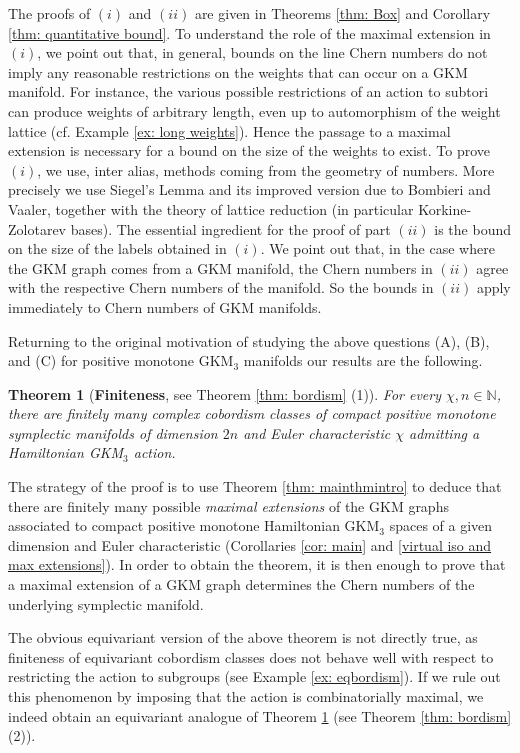\documentclass[12pt,a4paper]{amsart}
\newcommand{\NN}{\mathbb{N}}
\theoremstyle{plain}
\newtheorem{maintheorem}{Theorem}
\theoremstyle{definition}
\begin{document}
The proofs of $(i)$ and $(ii)$ are given in Theorems \ref{thm: Box} and Corollary \ref{thm: quantitative bound}.
To understand the role of the maximal extension in $(i)$, we point out that, in general, bounds on the line Chern numbers do not imply any reasonable restrictions on the weights that can occur on a GKM manifold. For instance, the various possible restrictions of an action to subtori can produce weights of arbitrary length, even up to automorphism of the weight lattice (cf. Example \ref{ex: long weights}). 
Hence the passage to a maximal extension is necessary for a bound on the size of the weights to exist. To prove $(i)$, we use, inter alias, methods coming from the geometry of numbers. More precisely we use Siegel's Lemma and its improved version due to Bombieri and Vaaler,
together with the theory of lattice reduction
(in particular Korkine-Zolotarev bases). The essential ingredient for the proof of part $(ii)$ is the bound on the size of the labels obtained in $(i)$. We point out that, in the case where the GKM graph comes from a GKM manifold, the Chern numbers in $(ii)$ agree with the respective Chern numbers of the manifold. So the bounds in $(ii)$ apply immediately to Chern numbers of GKM manifolds.



Returning to the original motivation of studying the above questions (A), (B), and (C) for positive monotone GKM$_3$ manifolds our results are the following.
\begin{maintheorem}[\textbf{Finiteness}, see Theorem \ref{thm: bordism} (1)]\label{thm: finiteness intro}
For every $\chi,n\in \NN$, there are finitely many complex cobordism classes of compact positive monotone symplectic manifolds of dimension $2n$ and Euler characteristic $\chi$ admitting a Hamiltonian GKM$_3$ action. 
\end{maintheorem}

The strategy of the proof is to use Theorem \ref{thm: mainthmintro} to deduce that there are finitely many possible
\emph{maximal extensions} of the GKM graphs associated to compact positive monotone Hamiltonian GKM$_3$
spaces of a given dimension and Euler characteristic (Corollaries \ref{cor: main} and \ref{virtual iso and max extensions}). 
In order to obtain the theorem, it is then enough to prove that a maximal extension of a GKM graph determines the Chern numbers of the underlying symplectic manifold. 


The obvious equivariant version of the above theorem is not directly true, as finiteness of equivariant cobordism classes does not behave well with respect to restricting the action to subgroups (see Example \ref{ex: eqbordism}). If we rule out this phenomenon by imposing that the action is combinatorially maximal,
 we indeed obtain an equivariant analogue of Theorem \ref{thm: finiteness intro} (see Theorem \ref{thm: bordism} (2)).
\end{document}
